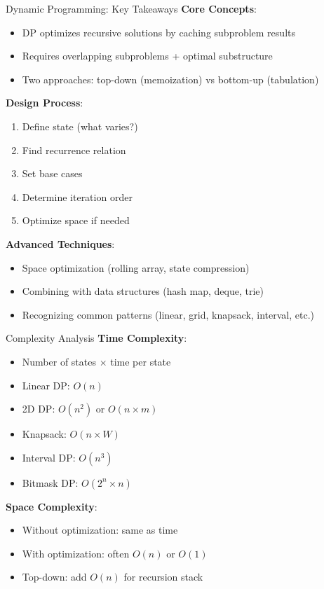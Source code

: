 \documentclass[aspectratio=169]{beamer}
\begin{document}
\begin{frame}{Dynamic Programming: Key Takeaways}
  \textbf{Core Concepts}:
  \begin{itemize}
    \item DP optimizes recursive solutions by caching subproblem results
    \item Requires overlapping subproblems + optimal substructure
    \item Two approaches: top-down (memoization) vs bottom-up (tabulation)
  \end{itemize}

  \vspace{0.5cm}

  \textbf{Design Process}:
  \begin{enumerate}
    \item Define state (what varies?)
    \item Find recurrence relation
    \item Set base cases
    \item Determine iteration order
    \item Optimize space if needed
  \end{enumerate}

  \vspace{0.5cm}

  \textbf{Advanced Techniques}:
  \begin{itemize}
    \item Space optimization (rolling array, state compression)
    \item Combining with data structures (hash map, deque, trie)
    \item Recognizing common patterns (linear, grid, knapsack, interval, etc.)
  \end{itemize}
\end{frame}

\begin{frame}{Complexity Analysis}
  \textbf{Time Complexity}:
  \begin{itemize}
    \item Number of states $\times$ time per state
    \item Linear DP: $O(n)$
    \item 2D DP: $O(n^2)$ or $O(n \times m)$
    \item Knapsack: $O(n \times W)$
    \item Interval DP: $O(n^3)$
    \item Bitmask DP: $O(2^n \times n)$
  \end{itemize}

  \vspace{0.5cm}

  \textbf{Space Complexity}:
  \begin{itemize}
    \item Without optimization: same as time
    \item With optimization: often $O(n)$ or $O(1)$
    \item Top-down: add $O(n)$ for recursion stack
  \end{itemize}
\end{frame}
\end{document}
